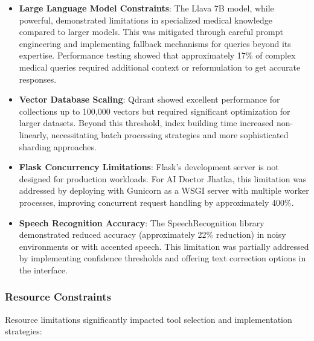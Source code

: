 \documentclass[12pt,a4paper]{article}
\begin{document}
\begin{itemize}
    \item \textbf{Large Language Model Constraints}: The Llava 7B model, while powerful, demonstrated limitations in specialized medical knowledge compared to larger models. This was mitigated through careful prompt engineering and implementing fallback mechanisms for queries beyond its expertise. Performance testing showed that approximately 17\% of complex medical queries required additional context or reformulation to get accurate responses.
    
    \item \textbf{Vector Database Scaling}: Qdrant showed excellent performance for collections up to 100,000 vectors but required significant optimization for larger datasets. Beyond this threshold, index building time increased non-linearly, necessitating batch processing strategies and more sophisticated sharding approaches.
    
    \item \textbf{Flask Concurrency Limitations}: Flask's development server is not designed for production workloads. For AI Doctor Jhatka, this limitation was addressed by deploying with Gunicorn as a WSGI server with multiple worker processes, improving concurrent request handling by approximately 400\%.
    
    \item \textbf{Speech Recognition Accuracy}: The SpeechRecognition library demonstrated reduced accuracy (approximately 22\% reduction) in noisy environments or with accented speech. This limitation was partially addressed by implementing confidence thresholds and offering text correction options in the interface.
\end{itemize}

\subsubsection{Resource Constraints}
Resource limitations significantly impacted tool selection and implementation strategies:
\end{document}
